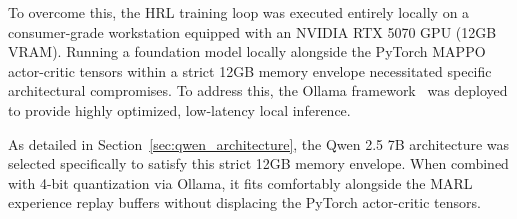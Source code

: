 To overcome this, the HRL training loop was executed entirely locally on a consumer-grade workstation equipped with an NVIDIA RTX 5070 GPU (12GB VRAM). Running a foundation model locally alongside the PyTorch MAPPO actor-critic tensors within a strict 12GB memory envelope necessitated specific architectural compromises. To address this, the Ollama framework~\parencite{ollama_2024} was deployed to provide highly optimized, low-latency local inference.

As detailed in Section~\ref{sec:qwen_architecture}, the Qwen 2.5 7B architecture was selected specifically to satisfy this strict 12GB memory envelope. When combined with 4-bit quantization via Ollama, it fits comfortably alongside the MARL experience replay buffers without displacing the PyTorch actor-critic tensors.